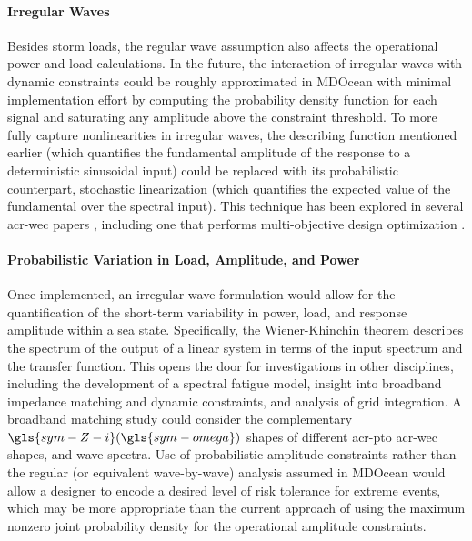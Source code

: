 \documentclass[a4paper,fleqn,colorlinks,unicode,lineno]{cas-dc} %
\providecommand{\DIFaddtex}[1]{{\protect\color{blue}\uwave{#1}}} %
\providecommand{\DIFadd}[1]{\texorpdfstring{\DIFaddtex{#1}}{#1}} %
\begin{document}
    \paragraph{Irregular Waves}
    Besides storm loads, the regular wave assumption also affects the operational power and load calculations.
    In the future, the interaction of irregular waves with dynamic constraints could be roughly approximated in MDOcean with minimal implementation effort by computing the probability density function for each signal and saturating any amplitude above the constraint threshold.
    To more fully capture nonlinearities in irregular waves, the describing function mentioned earlier (which quantifies the fundamental amplitude of the response to a deterministic sinusoidal input) could be replaced with its probabilistic counterpart, stochastic linearization (which quantifies the expected value of the fundamental over the spectral input).
    This technique has been explored in several \gls{acr-wec} papers \citep{da_silva_statistical_2020,da_silva_stochastic_2023,kluger_synergistic_2017,folley_spectral-domain_2016,spanos_efficient_2016}, including one that performs multi-objective design optimization \citep{neshat_enhancing_2024}.

    \paragraph{Probabilistic Variation in Load, Amplitude, and Power}
    Once implemented, an irregular wave formulation would allow for the quantification of the short-term variability in power, load, and response amplitude within a sea state.
    Specifically, the Wiener-Khinchin theorem describes the spectrum of the output of a linear system in terms of the input spectrum and the transfer function.
    This opens the door for investigations in other disciplines, including the development of a spectral fatigue model, insight into broadband impedance matching and dynamic constraints, and analysis of grid integration.
    A broadband matching study could consider the complementary $\gls{sym-Z-i}(\gls{sym-omega})$  shapes of different \gls{acr-pto} \DIFadd{types, }\gls{acr-wec} shapes, and wave spectra.
    Use of probabilistic amplitude constraints rather than the regular (or equivalent wave-by-wave) analysis assumed in MDOcean would allow a designer to encode a desired level of risk tolerance for extreme events, which may be more appropriate than the current approach of using the maximum nonzero joint probability density for the operational amplitude constraints. 
\end{document}
